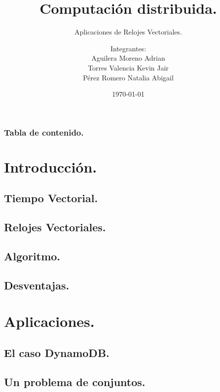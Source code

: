 \documentclass[9pt]{beamer}
\title{Computación distribuida.}
\subtitle{Aplicaciones de Relojes Vectoriales.}
\author{Integrantes:\\
        Aguilera Moreno Adrian\\
        Torres Valencia Kevin Jair\\
        Pérez Romero Natalia Abigail}
\institute{Facultad de Ciencias, UNAM}
\date{\today}
\begin{document}
\titlepage

\begin{frame}
 \frametitle{Tabla de contenido.}
 \tableofcontents
\end{frame}

\section{Introducción.}


\subsection{Tiempo Vectorial.}


\subsection{Relojes Vectoriales.}


\def\beamer@mytheme@style{green}

\subsection{Algoritmo.}

\subsection{Desventajas.}


\section{Aplicaciones.}
\subsection{El caso DynamoDB.}

\subsection{Un problema de conjuntos.}

\end{document}
